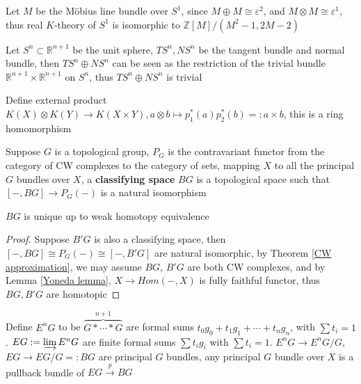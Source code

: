 \documentclass[main]{subfiles}
\begin{document}
\begin{conjecture}
Let $M$ be the M\"{o}bius line bundle over $S^1$, since $M\oplus M\cong\varepsilon^2$, and $M\otimes M\cong\varepsilon^1$, thus real $K$-theory of $S^1$ is isomorphic to $\mathbb Z[M]/(M^2-1,2M-2)$
\end{conjecture}

\begin{example}
Let $S^n\subset\mathbb R^{n+1}$ be the unit sphere, $TS^n,NS^n$ be the tangent bundle and normal bundle, then $TS^n\oplus NS^n$ can be seen as the restriction of the trivial bundle $\mathbb R^{n+1}\times\mathbb R^{n+1}$ on $S^n$, thus $TS^n\oplus NS^n$ is trivial
\end{example}

\begin{definition}
Define external product $K(X)\otimes K(Y)\to K(X\times Y), a\otimes b\mapsto p_1^*(a)p_2^*(b)=:a\times b$, this is a ring homomorphism
\end{definition}

\begin{definition}
Suppose $G$ is a topological group, $P_G$ is the contravariant functor from the category of CW complexes to the category of sets, mapping $X$ to all the principal $G$ bundles over $X$, a \textbf{classifying space} $BG$ is a topological space such that $[-,BG]\to P_G(-)$ is a natural isomorphism
\end{definition}

\begin{lemma}
$BG$ is unique up to weak homotopy equivalence
\end{lemma}

\begin{proof}
Suppose $B'G$ is also a classifying space, then $[-,BG]\cong P_G(-)\cong[-,B'G]$ are natural isomorphic, by Theorem \ref{CW approximation}, we may assume $BG$, $B'G$ are both CW complexes, and by Lemma \ref{Yoneda lemma}, $X\to Hom(-,X)$ is fully faithful functor, thus $BG,B'G$ are homotopic
\end{proof}

\begin{theorem}
Define $E^nG$ to be $\overbrace{G*\cdots*G}^{n+1}$ are formal sums $t_0g_0+t_1g_1+\cdots+t_ng_n$, with $\sum t_i=1$. $EG:=\varinjlim E^nG$ are finite formal sums $\sum t_ig_i$ with $\sum t_i=1$. $E^nG\to E^nG/G$, $EG\to EG/G=:BG$ are principal $G$ bundles, any principal $G$ bundle over $X$ is a pullback bundle of $EG\xrightarrow{p} BG$
\end{theorem}
\end{document}
